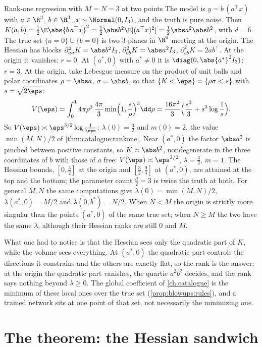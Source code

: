 \begin{refsection}
\begin{computation}{Rank-one regression with $M=N=3$ at two points}\label{comp:llc:rankone}
\step The model is $y=b\,(a^\top x)$ with $a\in\R^3$, $b\in\R^3$, $x\sim\Normal(0,I_3)$, and the truth is pure noise. Then $K(a,b)=\tfrac12\E\abs{b\,a^\top x}^2=\tfrac12\abs b^2\E[(a^\top x)^2]=\tfrac12\abs a^2\abs b^2$, with $d=6$. The true set $\{a=0\}\cup\{b=0\}$ is two $3$-planes in $\R^6$ meeting at the origin.
\step The Hessian has blocks $\partial^2_{aa}K=\abs b^2I_3$, $\partial^2_{bb}K=\abs a^2I_3$, $\partial^2_{ab}K=2ab^\top$. At the origin it vanishes: $r=0$. At $(a^*,0)$ with $a^*\ne0$ it is $\diag(0,\abs{a^*}^2I_3)$: $r=3$.
\step At the origin, take Lebesgue measure on the product of unit balls and polar coordinates $\rho=\abs a$, $\sigma=\abs b$, so that $\{K<\eps\}=\{\rho\sigma<s\}$ with $s=\sqrt{2\eps}$:
\[
V(\eps)=\int_0^1 4\pi\rho^2\,\frac{4\pi}3\min\Bigl(1,\frac s\rho\Bigr)^3\dd\rho=\frac{16\pi^2}3\Bigl(\frac{s^3}3+s^3\log\frac1s\Bigr).
\]
So $V(\eps)\asymp\eps^{3/2}\log\frac1\eps$: $\lambda(0)=\tfrac32$ and $m(0)=2$, the value $\min(M,N)/2$ of \cref{thm:catalogue:rankone}.
\step Near $(a^*,0)$ the factor $\abs a^2$ is pinched between positive constants, so $K\asymp\abs b^2$, nondegenerate in the three coordinates of $b$ with those of $a$ free: $V(\eps)\asymp\eps^{3/2}$, $\lambda=\tfrac32$, $m=1$. The Hessian bounds, $[0,\tfrac32]$ at the origin and $[\tfrac32,\tfrac94]$ at $(a^*,0)$, are attained at the top and the bottom; the parameter count $\tfrac d2=3$ is twice the truth at both.
\step For general $M,N$ the same computations give $\lambda(0)=\min(M,N)/2$, $\lambda(a^*,0)=M/2$ and $\lambda(0,b^*)=N/2$. When $N<M$ the origin is strictly more singular than the points $(a^*,0)$ of the same true set; when $N\ge M$ the two have the same $\lambda$, although their Hessian ranks are still $0$ and $M$.
\end{computation}

What one had to notice is that the Hessian sees only the quadratic part of $K$, while the volume sees everything. At $(a^*,0)$ the quadratic part controls the directions it constrains and the others are exactly flat, so the rank is the answer; at the origin the quadratic part vanishes, the quartic $a^2b^2$ decides, and the rank says nothing beyond $\lambda\ge0$. The global coefficient of \cref{ch:catalogue} is the minimum of these local ones over the true set (\cref{prop:blowups:rules}), and a trained network sits at one point of that set, not necessarily the minimizing one.

\section{The theorem: the Hessian sandwich}\label{sec:llc:hessian}


\end{refsection}
